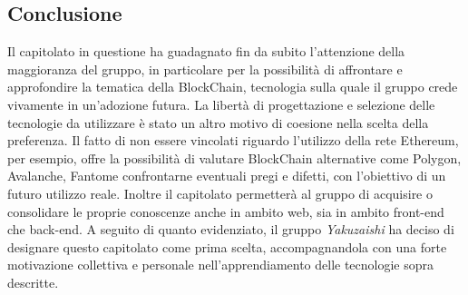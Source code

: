 \subsection{Conclusione}
Il capitolato in questione ha guadagnato fin da subito l'attenzione della maggioranza del gruppo, in particolare per la possibilità di affrontare e approfondire la tematica della BlockChain, tecnologia sulla quale il gruppo crede vivamente in un'adozione futura.
La libertà di progettazione e selezione delle tecnologie da utilizzare è stato un altro motivo di coesione nella scelta della preferenza. Il fatto di non essere vincolati riguardo l'utilizzo della rete Ethereum, per esempio, offre la possibilità di valutare BlockChain
alternative come Polygon\glo, Avalanche\glo, Fantom\glo e confrontarne eventuali pregi e difetti, con l'obiettivo di un futuro utilizzo reale.
\newline
Inoltre il capitolato permetterà al gruppo di acquisire o consolidare le proprie conoscenze anche in ambito web, sia in ambito front-end che back-end. A seguito di quanto evidenziato, il gruppo \textit{Yakuzaishi} ha deciso di designare questo capitolato come prima scelta,
accompagnandola con una forte motivazione collettiva e personale nell'apprendiamento delle tecnologie sopra descritte.
